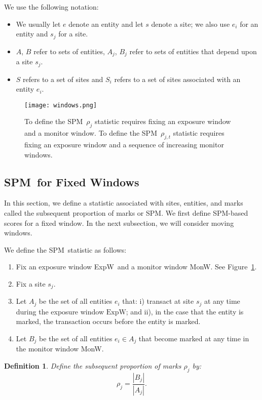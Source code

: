 \documentclass{acm_proc_article-sp}
\newtheorem{definition}{Definition}
\def\spm{\mbox{SPM}}
\def\expwindow{\mbox{ExpW}}
\def\monwindow{\mbox{MonW}}
\begin{document}
We use the following notation:

\begin{itemize}
\item  We usually let $e$ denote an entity and let $s$ denote a site; we also
use $e_i$ for an entity and $s_j$ for a site.

\item $A$, $B$ refer to sets of entities, $A_j$, $B_j$ refer to sets
of entities that depend upon a site  $s_j$.   

\item $S$ refers to a set of sites
and $S_i$ refers to a set of sites associated with an entity  $e_i$.

\end{itemize}


\begin{figure}
\centering
\texttt{[image: windows.png]}
\caption{To define the \spm\ $\rho_j$ statistic requires fixing an exposure window
and a monitor window. To define the \spm\ $\rho_{j,t}$ statistic requires fixing an exposure window
and a sequence of increasing monitor windows. 
}
\label{figure:windows}
\end{figure}


\subsection{\spm\ for Fixed Windows}

In this section, we define a statistic associated with sites, entities, and marks
called the subsequent proportion of marks or \spm.
We first define \spm-based scores for a fixed window.  In the next subsection,
we will consider moving windows.

We define the \spm\ statistic as follows:

\begin{enumerate}
\item Fix an exposure window \expwindow\  and a monitor window 
\monwindow.   See Figure~\ref{figure:windows}.
\item Fix a site $s_j$. 
\item Let $A_j$ be the set of all entities $e_i$ that: i) transact at site $s_j$ at
any time during the exposure window $\expwindow$; and ii), in the case that the entity
is marked,  the transaction occurs before the entity is marked.  
\item Let $B_j$ be the set of all entities $e_i \in A_j$ that become marked
at any time in the monitor window \monwindow.   
\end{enumerate}
\begin{definition}
Define the {\em subsequent proportion of marks} $\rho_j$ by:
$$\rho_j = \frac{ |B_j| }{| A_j |}.  $$
\end{definition}
\end{document}
